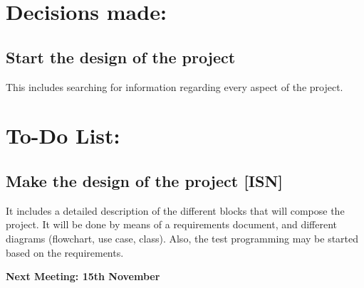 \documentclass{article}
\newenvironment{myindentpar}[1]%
 {\begin{list}{}%
         {\setlength{\leftmargin}{#1}}%
         \item[]%
 }
 {\end{list}}
\begin{document}
\section{\LARGE Decisions made:}
	\subsection{Start the design of the project}
		\begin{myindentpar}{1cm} 
		This includes searching for information regarding every aspect of the project. 
		\end{myindentpar}


\section{\LARGE To-Do List: }
	\subsection{Make the design of the project [ISN]}
		\begin{myindentpar}{1cm} 
		It includes a detailed description of the different blocks that will compose the project. It will be done by means of a requirements document, and different diagrams (flowchart, use case, class). 
		Also, the test programming may be started based on the requirements. 
		\end{myindentpar}
	


\begin {center}
{\Large \textbf{Next Meeting: 15th November }}
\end{center}
\end{document}
